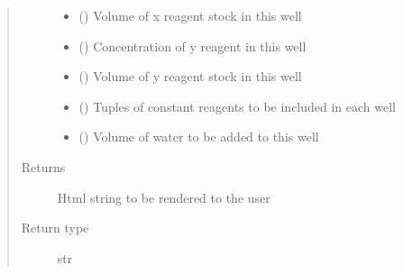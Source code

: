 \documentclass[letterpaper,10pt,english]{sphinxmanual}
\begin{document}
\begin{fulllineitems}
\begin{fulllineitems}
\begin{quote}
\begin{description}
\begin{itemize}
\item {} 
 ({\hyperref[\detokenize{polo.crystallography:polo.crystallography.cocktail.SignedValue}]{}}) \textendash{} Volume of x reagent stock in this well

\item {} 
 ({\hyperref[\detokenize{polo.crystallography:polo.crystallography.cocktail.SignedValue}]{}}) \textendash{} Concentration of y reagent in this well

\item {} 
 ({\hyperref[\detokenize{polo.crystallography:polo.crystallography.cocktail.SignedValue}]{}}) \textendash{} Volume of y reagent stock in this well

\item {} 
 () \textendash{} Tuples of constant reagents to be included in each well

\item {} 
 () \textendash{} Volume of water to be added to this well

\end{itemize}

\item[{Returns}] \leavevmode
Html string to be rendered to the user

\item[{Return type}] \leavevmode
str

\end{description}\end{quote}

\end{fulllineitems}


\begin{fulllineitems}
\label{\detokenize{polo.widgets:polo.widgets.optimize_widget.OptimizeWidget.run}}
\end{fulllineitems}


\end{fulllineitems}
\end{document}
